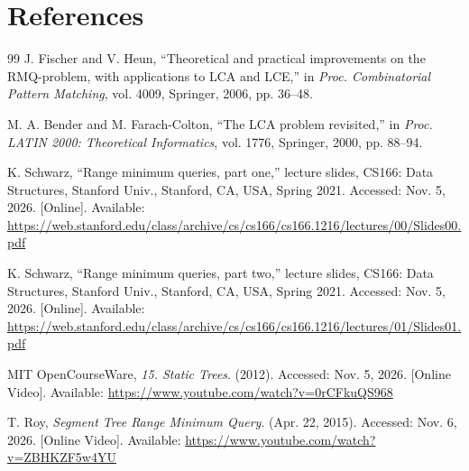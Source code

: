 \documentclass{article}
\theoremstyle{definition}
\begin{document}
\section{References}
\begin{thebibliography}{99}
 J. Fischer and V. Heun, ``Theoretical and practical improvements on the RMQ-problem, with applications to LCA and LCE,'' in \emph{Proc. Combinatorial Pattern Matching}, vol. 4009, Springer, 2006, pp. 36--48.

 M. A. Bender and M. Farach-Colton, ``The LCA problem revisited,'' in \emph{Proc. LATIN 2000: Theoretical Informatics}, vol. 1776, Springer, 2000, pp. 88--94.

 K. Schwarz, ``Range minimum queries, part one,'' lecture slides, CS166: Data Structures, Stanford Univ., Stanford, CA, USA, Spring 2021. Accessed: Nov. 5, 2026. [Online]. Available: \url{https://web.stanford.edu/class/archive/cs/cs166/cs166.1216/lectures/00/Slides00.pdf}

 K. Schwarz, ``Range minimum queries, part two,'' lecture slides, CS166: Data Structures, Stanford Univ., Stanford, CA, USA, Spring 2021. Accessed: Nov. 5, 2026. [Online]. Available: \url{https://web.stanford.edu/class/archive/cs/cs166/cs166.1216/lectures/01/Slides01.pdf}

 MIT OpenCourseWare, \emph{15. Static Trees}. (2012). Accessed: Nov. 5, 2026. [Online Video]. Available: \url{https://www.youtube.com/watch?v=0rCFkuQS968}

 T. Roy, \emph{Segment Tree Range Minimum Query}. (Apr. 22, 2015). Accessed: Nov. 6, 2026. [Online Video]. Available: \url{https://www.youtube.com/watch?v=ZBHKZF5w4YU}

\end{thebibliography}
\end{document}
